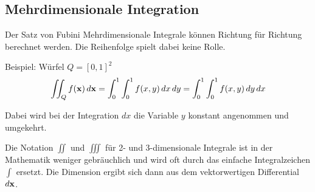   



\subsection{Mehrdimensionale Integration}

\begin{frame}{Der Satz von Fubini}
  Mehrdimensionale Integrale können Richtung für Richtung berechnet
  werden. Die Reihenfolge spielt dabei keine Rolle.

  \vspace{1ex}
  
  Beispiel: Würfel $Q=[0,1]^2$
  \begin{gather*}
    \iint_Q f(\mathbf{x})\,d\mathbf{x} = \int_0^1\int_0^1 f(x,y) \,dx\,dy
     = \int_0^1\int_0^1 f(x,y) \,dy\,dx
   \end{gather*}

   Dabei wird bei der Integration $dx$ die Variable $y$ konstant angenommen und umgekehrt.

   \vspace{1ex}

   \pause
   Die Notation $\iint$ und $\iiint$ für 2- und 3-dimensionale
   Integrale ist in der Mathematik weniger gebräuchlich und wird oft
   durch das einfache Integralzeichen $\int$ ersetzt. Die Dimension
   ergibt sich dann aus dem vektorwertigen Differential $d\mathbf{x}$.
\end{frame}

